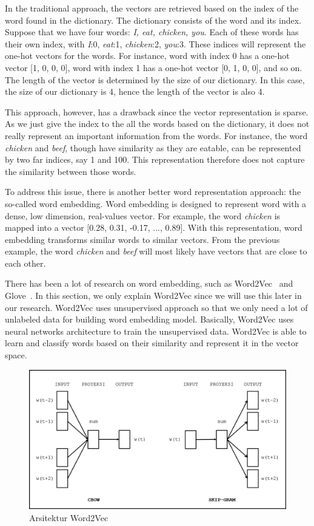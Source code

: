 In the traditional approach, the vectors are retrieved based on the index of the word found in the dictionary. The dictionary consists of the word and its index. Suppose that we have four words: \textit{I, eat, chicken, you}. Each of these words has their own index, with \textit{I}:0, \textit{eat}:1, \textit{chicken}:2, \textit{you}:3. These indices will represent the one-hot vectors for the words. For instance, word with index 0 has a one-hot vector [1, 0, 0, 0], word with index 1 has a one-hot vector [0, 1, 0, 0], and so on. The length of the vector is determined by the size of our dictionary. In this case, the size of our dictionary is 4, hence the length of the vector is also 4. 

This approach, however, has a drawback since the vector representation is sparse. As we just give the index to the all the words based on the dictionary, it does not really represent an important information from the words. For instance, the word \textit{chicken} and \textit{beef}, though have similarity as they are eatable, can be represented by two far indices, say 1 and 100. This representation therefore does not capture the similarity between those words. 

To address this issue, there is another better word representation approach: the so-called word embedding. Word embedding is designed to represent word with a dense, low dimension, real-values vector. For example, the word \textit{chicken} is mapped into a vector [0.28, 0.31, -0.17, ..., 0.89]. With this representation, word embedding transforms similar words to similar vectors. From the previous example, the word \textit{chicken} and \textit{beef} will most likely have vectors that are close to each other.

There has been a lot of research on word embedding, such as Word2Vec~\citep{mikolov2014word2vec} and Glove~\citep{pennington2014glove}. In this section, we only explain Word2Vec since we will use this later in our research. Word2Vec uses unsupervised approach so that we only need a lot of unlabeled data for building word embedding model. Basically, Word2Vec uses neural networks architecture to train the unsupervised data. Word2Vec is able to learn and classify words based on their similarity and represent it in the vector space.

\begin{figure}
	\centering
	\includegraphics[width=0.85\linewidth]{images/word2vec}
	\caption{Arsitektur Word2Vec}
	\label{fig:word2vec}
\end{figure}

